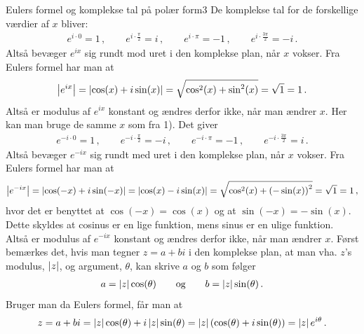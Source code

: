 \begin{opgave}{Eulers formel og komplekse tal på polær form}{3}
\opg De komplekse tal for de forskellige værdier af $x$ bliver:
\begin{align*}
e^{i \cdot 0} = 1 \, , \qquad e^{i \cdot \frac{\pi}{2}} = i \, , \qquad e^{i \cdot \pi} = -1 \, , \qquad e^{i \cdot \frac{3\pi}{2}} = -i \, .
\end{align*}
Altså bevæger $e^{ix}$ sig rundt mod uret i den komplekse plan, når $x$ vokser.
\opg Fra Eulers formel har man at
\begin{align*}
\left| e^{ix} \right| = \left| \cos(x) + i \sin(x) \right| = \sqrt{\cos^2(x) + \sin^2(x)} = \sqrt{1} = 1 \, .
\end{align*}
Altså  er modulus af $e^{ix}$ konstant og ændres derfor ikke, når man ændrer $x$.
\opg Her kan man bruge de samme $x$ som fra 1). Det giver
\begin{align*}
e^{-i \cdot 0} = 1 \, , \qquad e^{-i \cdot \frac{\pi}{2}} = -i \, , \qquad e^{-i \cdot \pi} = -1 \, , \qquad e^{-i \cdot \frac{3\pi}{2}} = i \, .
\end{align*}
Altså bevæger $e^{-ix}$ sig rundt med uret i den komplekse plan, når $x$ vokser.
\opg Fra Eulers formel har man at
\begin{align*}
\left| e^{-ix} \right| = \left| \cos(-x) + i \sin(-x) \right| = \left| \cos(x) - i \sin(x) \right| = \sqrt{\cos^2(x) + \left(-\sin(x)\right)^2} = \sqrt{1} = 1 \, ,
\end{align*}
hvor det er benyttet at $\cos(-x) = \cos(x)$ og at $\sin(-x) = -\sin(x)$. Dette skyldes at cosinus er en lige funktion, mens sinus er en ulige funktion. Altså  er modulus af $e^{-ix}$ konstant og ændres derfor ikke, når man ændrer $x$.
\opg Først bemærkes det, hvis man tegner $z=a+bi$ i den komplekse plan, at man vha. $z$'s modulus, $\left| z \right|$, og argument, $\theta$, kan skrive $a$ og $b$ som følger
\begin{align*}
a = \left| z \right| \cos(\theta)  \qquad \text{og} \qquad b = \left| z \right|\sin(\theta) \, .
\end{align*}
Bruger man da Eulers formel, får man at
\begin{align*}
z = a+bi = \left| z \right|\cos(\theta)+i\left| z \right|\sin(\theta) = \left| z \right|\left(\cos(\theta)+i\sin(\theta)\right) = \left| z \right|e^{i\theta} \, .
\end{align*}
\end{opgave}
